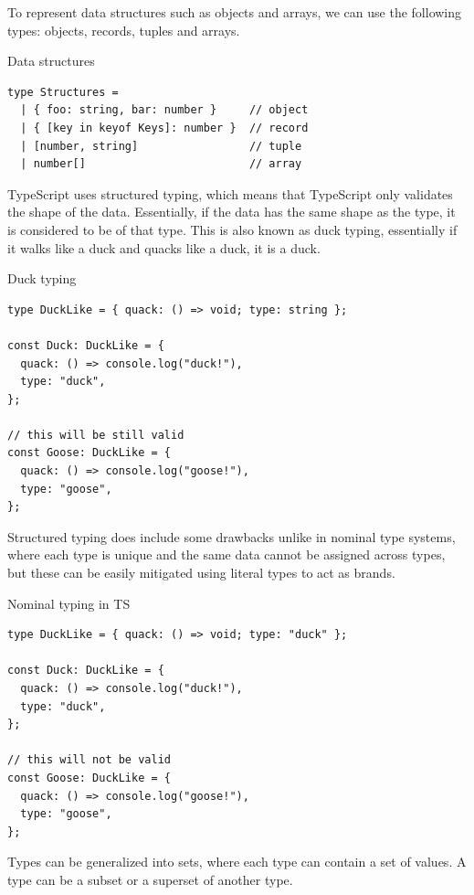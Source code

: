 To represent data structures such as objects and arrays, we can use the following types: objects, records, tuples and arrays.

\begin{listing}[h]
  \caption{Data structures}
  \begin{verbatim}
type Structures = 
  | { foo: string, bar: number }     // object
  | { [key in keyof Keys]: number }  // record
  | [number, string]                 // tuple
  | number[]                         // array
\end{verbatim}
\end{listing}

TypeScript uses structured typing, which means that TypeScript only validates the shape of the data. Essentially, if the data has the same shape as the type, it is considered to be of that type. This is also known as duck typing, essentially if it walks like a duck and quacks like a duck, it is a duck.

\begin{listing}[h]
  \caption{Duck typing}
  \begin{verbatim}
type DuckLike = { quack: () => void; type: string };

const Duck: DuckLike = {
  quack: () => console.log("duck!"),
  type: "duck",
};

// this will be still valid
const Goose: DuckLike = {
  quack: () => console.log("goose!"),
  type: "goose",
};
\end{verbatim}
\end{listing}

Structured typing does include some drawbacks unlike in nominal type systems, where each type is unique and the same data cannot be assigned across types, but these can be easily mitigated using literal types to act as brands.

\begin{listing}[h]
  \caption{Nominal typing in TS}
  \begin{verbatim}
type DuckLike = { quack: () => void; type: "duck" };

const Duck: DuckLike = {
  quack: () => console.log("duck!"),
  type: "duck",
};

// this will not be valid
const Goose: DuckLike = {
  quack: () => console.log("goose!"),
  type: "goose",
};
\end{verbatim}
\end{listing}


Types can be generalized into sets, where each type can contain a set of values. A type can be a subset or a superset of another type.

